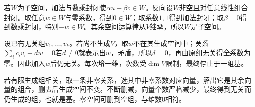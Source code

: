 \label{der:7-1}
若$W$为子空间，加法与数乘封闭使$\alpha u+\beta v\in W$。反向设$W$非空且对任意线性组合封闭。取任意$w\in W$与零系数，得到$0\in W$；取系数$1,1$得到加法封闭；取$\beta=0$得到数乘封闭，特别$-w\in W$。其余空间运算律从$V$继承，所以$W$是子空间。

设已有无关组$v_1,\ldots,v_k$。若尚不生成$V$，取$w$不在其生成空间中；关系$\sum_i c_iv_i+dw=0$若$d\ne0$就表示出$w$，矛盾，所以$d=0$，再由原组无关得全系数为零。因此加入$w$后仍无关。每次增一维，次数受$\dim V$限制，最终停止于一组基。

若有限生成组相关，取一条非零关系，选其中非零系数对应向量，解出它是其余向量的组合，删去后生成空间不变。不断删减，向量个数严格减少，最终得到无关而仍生成的组，也就是基。零空间可删到空组，与维数0相符。
